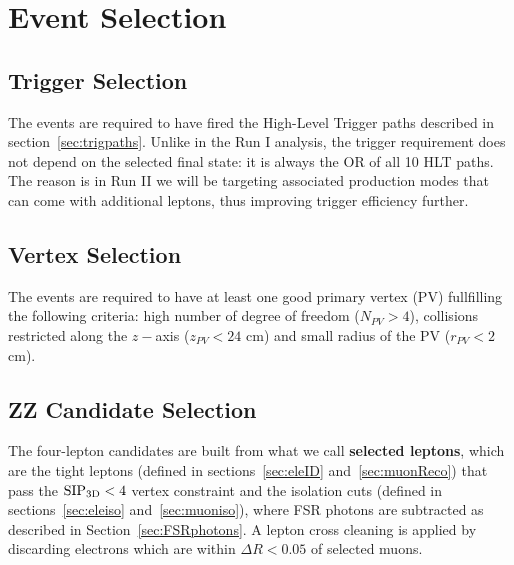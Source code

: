 \chapter{Event Selection}

\section{Trigger Selection}
\label{sec:HLTsel}

The events are required to have fired the High-Level Trigger paths described in section~\ref{sec:trigpaths}. Unlike in the Run I analysis, the trigger requirement does not depend on the selected final state: it is always the OR of all 10 HLT paths. The reason is in Run II we will be targeting associated production modes that can come with additional leptons, thus improving trigger efficiency further.


\section{Vertex Selection}
\label{sec:vertexsel}

The events are required to have at least one good primary
vertex (PV) fullfilling the following criteria: high number of degree
of freedom ($N_{PV}>4$), collisions restricted along the $z-$axis
($z_{PV}<24$ cm) and small radius of the PV ($r_{PV}<2$ cm).


\section{ZZ Candidate Selection}
\label{sec:zzcandsel}

The four-lepton candidates are built from what we call {\bf selected leptons}, which  
are the tight leptons (defined in sections~\ref{sec:eleID} and~\ref{sec:muonReco}) that pass the ${\rm SIP_{3D}} < 4$ vertex constraint
and the isolation cuts (defined in sections~\ref{sec:eleiso} and~\ref{sec:muoniso}), 
where FSR photons are subtracted as described in Section~\ref{sec:FSRphotons}.
A lepton cross cleaning is applied 
by discarding electrons which are within $\Delta R < 0.05$ of selected muons. 


